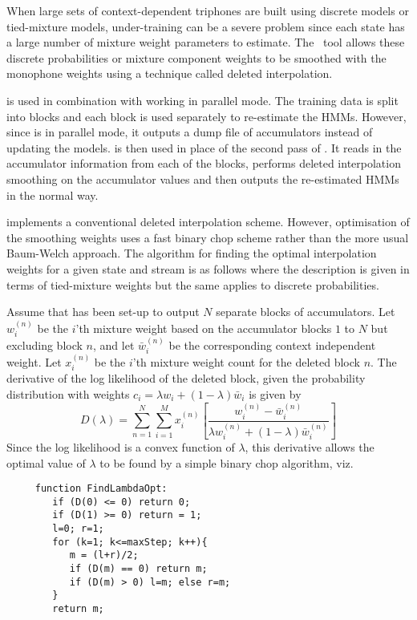 
When large sets of context-dependent triphones are built using
discrete models or
tied-mixture models, under-training can be a 
severe problem since each 
state has a large number of mixture weight parameters to estimate.
The \HTK\ tool  allows these discrete probabilities or
mixture component weights
to be smoothed with the monophone weights using a technique called 
deleted interpolation.  

 is used in combination with 
working in parallel mode.  The training data is split
into blocks and each block is used separately to re-estimate the
HMMs.  However, since  is in parallel mode, it outputs a dump
file of accumulators instead of updating the models.   is then
used in place of the second pass of .  It reads in the 
accumulator information from each of the blocks, performs deleted
interpolation smoothing on the accumulator values and then outputs
the re-estimated HMMs in the normal way.

 implements a 
conventional deleted interpolation scheme.
However, optimisation of the smoothing weights uses a fast 
binary chop scheme 
rather than the more usual Baum-Welch approach.
The algorithm for finding the optimal interpolation weights for a given
state and stream is as follows where the description is given in terms
of tied-mixture weights but the same applies to discrete probabilities.  

Assume that 
has been set-up to output $N$ separate blocks of accumulators.
Let $w_i^{(n)}$ be the $i$'th
mixture weight based on the accumulator blocks $1$ to $N$ but excluding
block $n$, and let $\bar{w}_i^{(n)}$ be the corresponding context
independent weight.  Let $x_i^{(n)}$ be the $i$'th mixture weight 
count for the deleted block $n$.  The derivative of the log
likelihood of the deleted block, given the probability distribution with
weights $c_i = \lambda w_i + (1 - \lambda) \bar{w}_i$ is given by
\begin{equation}
  D(\lambda) = \sum_{n=1}^N \sum_{i=1}^M x_i^{(n)}
   \left[ \frac{w_i^{(n)} - \bar{w}_i^{(n)}}{
            \lambda w_i^{(n)} + (1 - \lambda ) \bar{w}_i^{(n)}} 
   \right]
\end{equation}
Since the log likelihood is a convex function of $\lambda$, this derivative
allows the optimal value of $\lambda$ to be found by a simple
binary chop algorithm, viz.
\begin{verbatim}
     function FindLambdaOpt:
        if (D(0) <= 0) return 0;
        if (D(1) >= 0) return = 1;
        l=0; r=1;
        for (k=1; k<=maxStep; k++){
           m = (l+r)/2;
           if (D(m) == 0) return m;
           if (D(m) > 0) l=m; else r=m;
        }
        return m;
\end{verbatim}

